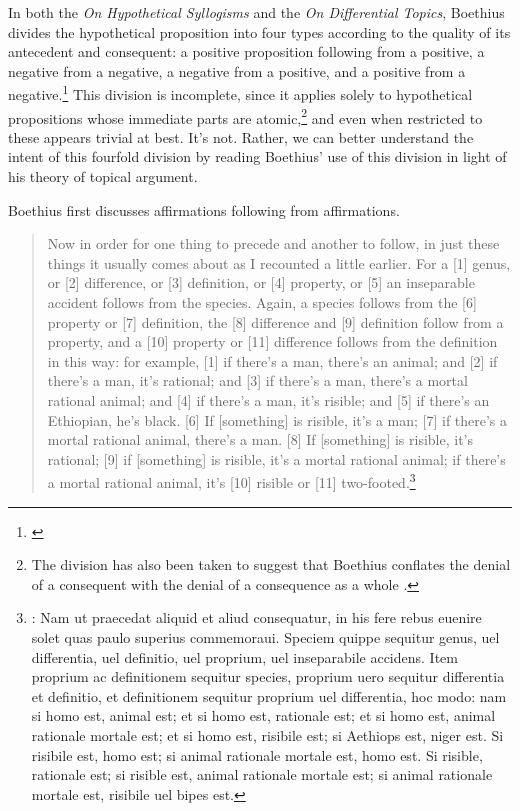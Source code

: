 \documentclass[a4paper, 11pt]{article}
\begin{document}
In both the \emph{On Hypothetical Syllogisms} and the \emph{On Differential Topics}, 
Boethius divides the hypothetical proposition into four types according to the quality of its antecedent and consequent: 
a positive proposition following from a positive, 
a negative from a negative, 
a negative from a positive, 
and a positive from a negative.\footnote{\autocite[1.3.5]{BHS} \autocite[1176B-C]{BDT}} This division is incomplete, since it applies solely to hypothetical propositions whose immediate parts are atomic,\footnote{The division has also been taken to suggest that Boethius conflates the denial of a consequent with the denial of a consequence as a whole \autocite[157-158]{Martin2007}.} and even when restricted to these appears trivial at best. It's not. Rather, we can better understand the intent of this fourfold division by reading Boethius' use of this division in light of his theory of topical argument.

Boethius first discusses affirmations following from affirmations.
\begin{quote}
Now in order for one thing to precede and another to follow, in just these things it usually comes about as I recounted a little earlier. For a [1] genus, or [2] difference, or [3] definition, or [4] property, or [5] an inseparable accident follows from the species. Again, a species follows from the [6] property or [7] definition, the [8] difference and [9] definition follow from a property, and a [10] property or [11] difference follows from the definition in this way: for example, [1] if there's a man, there's an animal; and [2] if there's a man, it's rational; and [3] if there's a man, there's a mortal rational animal; and [4] if there's a man, it's risible; and [5] if there's an Ethiopian, he's black. [6] If [something] is risible, it's a man; [7] if there's a mortal rational animal, there's a man. [8] If [something] is risible, it's rational; [9] if [something] is risible, it's a mortal rational animal; if there's a mortal rational animal, it's [10] risible or [11] two-footed.\footnote{\autocite[1179A-B]{BDT}: Nam ut praecedat aliquid et aliud consequatur, in his fere rebus euenire solet quas paulo superius commemoraui. Speciem quippe sequitur genus, uel differentia, uel definitio, uel proprium, uel inseparabile accidens. Item proprium ac definitionem sequitur species, proprium uero sequitur differentia et definitio, et definitionem sequitur proprium uel differentia, hoc modo: nam si homo est, animal est; et si homo est, rationale est; et si homo est, animal rationale mortale est; et si homo est, risibile est; si Aethiops est, niger est. Si risibile est, homo est; si animal rationale mortale est, homo est. Si risible, rationale est; si risible est, animal rationale mortale est; si animal rationale mortale est, risibile uel bipes est.}
\end{quote}
\end{document}
